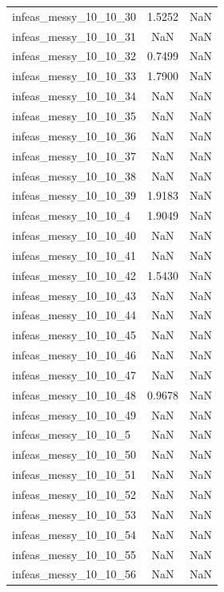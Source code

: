 \begin{longtable}{lcc}
infeas\_messy\_10\_10\_30  &   1.5252 &     NaN \\
infeas\_messy\_10\_10\_31  &      NaN &     NaN \\
infeas\_messy\_10\_10\_32  &   0.7499 &     NaN \\
infeas\_messy\_10\_10\_33  &   1.7900 &     NaN \\
infeas\_messy\_10\_10\_34  &      NaN &     NaN \\
infeas\_messy\_10\_10\_35  &      NaN &     NaN \\
infeas\_messy\_10\_10\_36  &      NaN &     NaN \\
infeas\_messy\_10\_10\_37  &      NaN &     NaN \\
infeas\_messy\_10\_10\_38  &      NaN &     NaN \\
infeas\_messy\_10\_10\_39  &   1.9183 &     NaN \\
infeas\_messy\_10\_10\_4   &   1.9049 &     NaN \\
infeas\_messy\_10\_10\_40  &      NaN &     NaN \\
infeas\_messy\_10\_10\_41  &      NaN &     NaN \\
infeas\_messy\_10\_10\_42  &   1.5430 &     NaN \\
infeas\_messy\_10\_10\_43  &      NaN &     NaN \\
infeas\_messy\_10\_10\_44  &      NaN &     NaN \\
infeas\_messy\_10\_10\_45  &      NaN &     NaN \\
infeas\_messy\_10\_10\_46  &      NaN &     NaN \\
infeas\_messy\_10\_10\_47  &      NaN &     NaN \\
infeas\_messy\_10\_10\_48  &   0.9678 &     NaN \\
infeas\_messy\_10\_10\_49  &      NaN &     NaN \\
infeas\_messy\_10\_10\_5   &      NaN &     NaN \\
infeas\_messy\_10\_10\_50  &      NaN &     NaN \\
infeas\_messy\_10\_10\_51  &      NaN &     NaN \\
infeas\_messy\_10\_10\_52  &      NaN &     NaN \\
infeas\_messy\_10\_10\_53  &      NaN &     NaN \\
infeas\_messy\_10\_10\_54  &      NaN &     NaN \\
infeas\_messy\_10\_10\_55  &      NaN &     NaN \\
infeas\_messy\_10\_10\_56  &      NaN &     NaN \\

\end{longtable}
